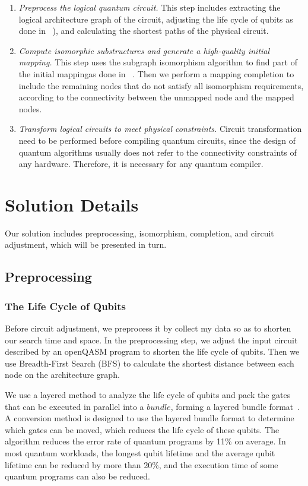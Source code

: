\documentclass[runningheads]{llncs}
\begin{document}
\begin{enumerate}
	\item \emph{Preprocess the logical quantum circuit.} 
	This step includes extracting the logical architecture graph of the circuit, adjusting the life cycle of qubits as done in ~\cite{2019Zhang}),  and calculating the shortest paths of the physical circuit.
	\item \emph{Compute isomorphic substructures and generate a high-quality initial mapping.}
	This step uses the subgraph isomorphism algorithm to find part of the initial mappingas done in ~\cite{Sun2020}.
	Then we perform a mapping completion to include the remaining nodes that do not satisfy all isomorphism requirements, according to the connectivity between the unmapped node and the mapped nodes.
	\item \emph{Transform logical circuits to meet physical constraints.}
	Circuit transformation need to be performed before compiling quantum circuits, since the design of quantum algorithms usually does not refer to the connectivity constraints of any hardware. Therefore, it is necessary for any quantum compiler. 
\end{enumerate}

\section{Solution Details}
\label{Solution Details}
Our solution includes preprocessing, isomorphism, completion, and circuit adjustment, which will be presented in turn.
\subsection{Preprocessing}
\subsubsection{The Life Cycle of Qubits}
Before circuit adjustment, we preprocess it by collect my data so as to shorten our search time and space. In the preprocessing step, we adjust the input circuit described by an openQASM program to shorten the life cycle of qubits. Then we use Breadth-First Search (BFS) to calculate the shortest distance between each node on the architecture graph.

We use a layered method to analyze the life cycle of qubits and pack the gates that can be executed in parallel into a $bundle$, forming a layered bundle format~\cite{2019Zhang}.
A conversion method is designed to use the layered bundle format to determine which gates can be moved, which reduces the life cycle of these qubits. The algorithm reduces the error rate of quantum programs by 11\% on average. In most quantum workloads, the longest qubit lifetime and the average qubit lifetime can be reduced by more than 20\%, and the execution time of some quantum programs can also be reduced.
\end{document}
